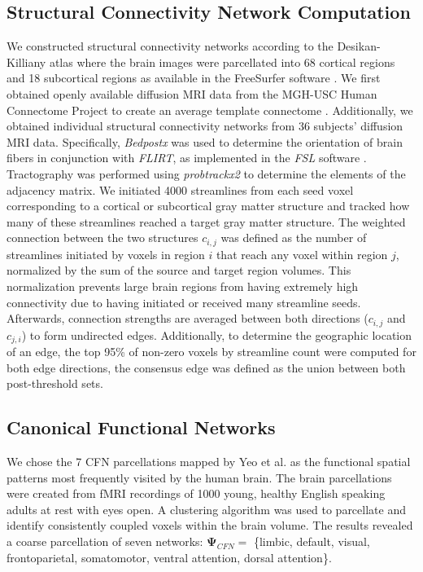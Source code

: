 \documentclass{article}
\begin{document}
\subsection{Structural Connectivity Network Computation} We constructed structural connectivity networks according to the Desikan-Killiany atlas where the brain images were parcellated into 68 cortical regions and 18 subcortical regions as available in the FreeSurfer software \cite{Fischl2002, Desikan2006}. We first obtained openly available diffusion MRI data from the MGH-USC Human Connectome Project to create an average template connectome \cite{McNab2013}. Additionally, we obtained individual structural connectivity networks from 36 subjects' diffusion MRI data. Specifically, \textit{Bedpostx} was used to determine the orientation of brain fibers in conjunction with \textit{FLIRT}, as implemented in the \textit{FSL} software \cite{Jenkinson2012}. Tractography was performed using \textit{probtrackx2} to determine the elements of the adjacency matrix. We initiated 4000 streamlines from each seed voxel corresponding to a cortical or subcortical gray matter structure and tracked how many of these streamlines reached a target gray matter structure.
The weighted connection between the two structures $c_{i,j}$ was defined as the number of streamlines initiated by voxels in region $i$ that reach any voxel within region $j$, normalized by the sum of the source and target region volumes. This normalization prevents large brain regions from having extremely high connectivity due to having initiated or received many streamline seeds. Afterwards, connection strengths are averaged between both directions ($c_{i,j}$ and $c_{j,i}$) to form undirected edges. Additionally, to determine the geographic location of an edge, the top 95\% of non-zero voxels by streamline count were computed for both edge directions, the consensus edge was defined as the union between both post-threshold sets.

\subsection{Canonical Functional Networks}
We chose the 7 CFN parcellations mapped by Yeo et al. \cite{Yeo2011} as the functional spatial patterns most frequently visited by the human brain. The brain parcellations were created from fMRI recordings of 1000 young, healthy English speaking adults at rest with eyes open. A clustering algorithm was used to parcellate and identify consistently coupled voxels within the brain volume. The results revealed a coarse parcellation of seven networks: $\pmb{\Psi}_{CFN} = $ \{limbic, default, visual, frontoparietal, somatomotor, ventral attention, dorsal attention\}.
\end{document}
